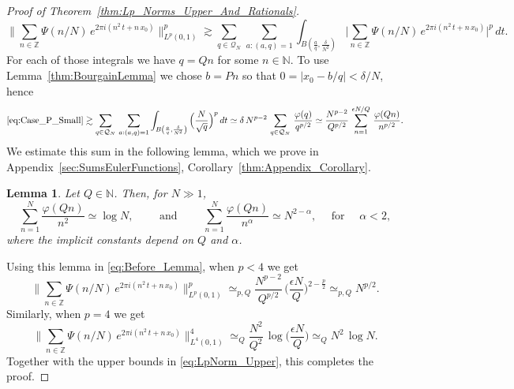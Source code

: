 \documentclass[11pt,reqno]{amsart}
\newtheorem{lem}[thm]{Lemma}
\theoremstyle{definition}
\begin{document}
\begin{proof}[Proof of Theorem~\ref{thm:Lp_Norms_Upper_And_Rationals}]
\begin{equation}
 \Big\lVert  \sum_{n \in \mathbb Z} \Psi(n/N) \,  e^{2\pi i (n^2 \, t + n \, x_0)}  \Big\rVert_{L^p(0,1)}^p  \gtrsim \sum_{q \in \mathcal Q_N} \, \sum_{a : (a,q) = 1 } \int_{B\left(  \frac{a}{q}, \frac{\delta }{N^2} \right)} \Big|  \sum_{n \in \mathbb Z} \Psi(n/N)  \,  e^{2\pi i (n^2 \, t + n \, x_0)}   \Big|^p   \, dt.
\end{equation} 
For each of those integrals we have $q = Qn$ for some $n \in \mathbb N$. 
To use Lemma~\ref{thm:BourgainLemma}
we chose $b = Pn$ so that $0 = |x_0 - b/q| < \delta / N$, 
hence
\begin{equation}\label{eq:Before_Lemma}
 \eqref{eq:Case_P_Small}
 \gtrsim \sum_{q \in \mathcal Q_N} \, \sum_{a : (a,q) = 1 } \int_{B\left(  \frac{a}{q}, \frac{\delta }{N^2} \right)} \Big( \frac{N}{\sqrt{q}} \Big)^p  \, dt 
 \simeq  \delta \, N^{p-2}\, \sum_{q \in \mathcal Q_N} \,   \frac{\varphi(q)}{q^{p/2}} 
 \simeq \frac{N^{p-2}}{Q^{p/2}} \, \sum_{n=1}^{\epsilon N / Q} \,   \frac{\varphi(Qn)}{n^{p/2}}.
\end{equation} 
We estimate this sum in the following lemma, which we prove in Appendix~\ref{sec:SumsEulerFunctions}, Corollary~\ref{thm:Appendix_Corollary}.
\begin{lem}\label{thm:SumOfEulerQWithWeight}
Let $Q \in \mathbb N$. Then, for $N \gg 1$, 
\begin{equation}
\sum_{n=1}^N \frac{\varphi(Qn)}{n^2} \simeq \log N, \qquad \text{ and } \qquad \sum_{n=1}^N \frac{\varphi(Qn)}{n^\alpha} \simeq N^{2 -  \alpha}, \quad \text{ for } \quad \alpha < 2,
\end{equation}
where the implicit constants depend on $Q$ and $\alpha$. 
\end{lem}
Using this lemma in \eqref{eq:Before_Lemma}, when $p < 4$ we get
\begin{equation}
 \Big\lVert  \sum_{n \in \mathbb Z} \Psi(n/N)\,  e^{2\pi i (n^2 \, t + n \, x_0)}  \Big\rVert_{L^p(0,1)}^p
 \simeq_{p,Q}  \frac{N^{p-2}}{Q^{p/2}} \, \Big( \frac{\epsilon N}{Q} \Big)^{2-\frac{p}{2}} 
 \simeq_{p,Q} N^{p/2}. 
\end{equation}
Similarly, when $p = 4$ we get
\begin{equation}
 \Big\lVert  \sum_{n \in \mathbb Z} \Psi(n/N)\,  e^{2\pi i (n^2 \, t + n \, x_0)}  \Big\rVert_{L^4(0,1)}^4 
\simeq_{Q}  \frac{N^2}{Q^2} \, \log \Big( \frac{\epsilon N}{Q} \Big)
 \simeq_{Q} N^2 \, \log N.
\end{equation}
Together with the upper bounds in \eqref{eq:LpNorm_Upper}, this completes the proof. 
\end{proof}
\end{document}
